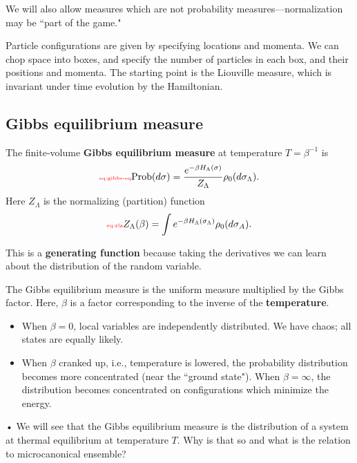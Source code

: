 \documentclass[12pt]{book}
\theoremstyle{norm}
\begin{document}
\begin{enumerate}
We will also allow measures which are not probability measures---normalization may be ``part of the game."

Particle configurations are given by specifying locations and momenta. We can chop space into boxes, and specify the number of particles in each box, and their positions and momenta. The starting point is the Liouville measure, which is invariant under time evolution by the Hamiltonian.
\end{enumerate}

\subsection{Gibbs equilibrium measure}
\begin{definition}\label{df:gibbs-eq}
The finite-volume \textbf{Gibbs equilibrium measure} at temperature $T=\beta^{-1}$ is 
\begin{equation}\label{eq:gibbs-eq}\text{{\color{red}\tiny eq:gibbs-eq}}
\text{Prob}(d\sigma) = \frac{e^{-\beta H_{\Lambda}(\sigma)}}{Z_\Lambda} \rho_0(d\sigma_{\Lambda}).
\end{equation}
Here $Z_{\Lambda}$ is the normalizing (partition) function
\begin{equation}\label{eq:zla}\text{{\color{red}\tiny eq:zla}}
Z_{\Lambda}(\beta) = \int e^{-\beta H_\Lambda(\sigma_\Lambda)} \rho_0(d\sigma_A).
\end{equation}
\end{definition}
This is a \textbf{generating function} because taking the derivatives we can learn about the distribution of the random variable.

The Gibbs equilibrium measure is the uniform measure %
multiplied by the Gibbs factor. Here, $\beta$ is a factor corresponding to the inverse of the \textbf{temperature}.

\begin{itemize}
\item
When $\beta=0$, local variables are independently distributed. We have chaos; all states are equally likely.
\item
When $\beta$ cranked up, i.e., temperature is lowered, the probability distribution becomes more concentrated (near the ``ground state"). When $\beta=\infty$, the distribution becomes concentrated on configurations which minimize the energy.
\end{itemize}•
We will see that the Gibbs equilibrium measure is the distribution of a system at thermal equilibrium at temperature $T$. Why is that so and what is the relation to microcanonical ensemble?
\end{document}
